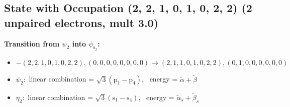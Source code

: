 \documentclass[12pt,a4paper]{article}
\begin{document}
\subsection*{State with Occupation (2, 2, 1, 0, 1, 0, 2, 2) (2 unpaired electrons, mult 3.0)}
        \noindent\textbf{Transition from $\psi_{2}$ into $\psi_{\text{s}_{2}}$:}
        \begin{itemize}
            \item $- (2, 2, 1, 0, 1, 0, 2, 2), (0, 0, 0, 0, 0, 0, 0, 0) \rightarrow (2, 1, 1, 0, 1, 0, 2, 2), (0, 1, 0, 0, 0, 0, 0, 0)$
        
            \item $\psi_{2}:$ linear combination = $\sqrt{3} \left(\text{p}_{1} - \text{p}_{4}\right)$, \
            energy = $\tilde{\alpha} + \tilde{\beta}$
            
            \item $\eta_{2}:$ linear combination = $\sqrt{3} \left(\text{s}_{1} - \text{s}_{4}\right)$, \
            energy = $\tilde{\alpha}_{s} + \tilde{\beta}_{s}$
            

\end{itemize}
\end{document}
